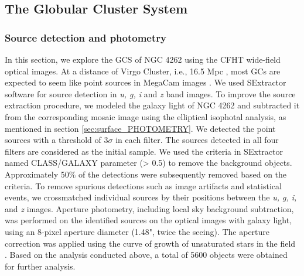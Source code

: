\documentclass[fleqn,usenatbib]{mnras}
\begin{document}
\subsection{The Globular Cluster System}
\label{sec:old_stellar_population_analysis}
\subsubsection{Source detection and photometry}
\label{sec:dectection_photometry}
In this section, we explore the GCS of NGC 4262 using the CFHT wide-field optical images. At a distance of Virgo Cluster, i.e., 16.5 Mpc \citep{2007Mei}, most GCs are expected to seem like point sources in MegaCam images \citep{durell_ngvs2014,2019MNRAS.483.1470R}. We used SExtractor software \citep{Bertin_arnouts1996} for source detection in {\it u, g, i} and {\it z} band images. To improve the source extraction procedure, we modeled the galaxy light of NGC 4262 and subtracted it from the corresponding mosaic image using the elliptical isophotal analysis, as mentioned in section \ref{sec:surface_PHOTOMETRY}. We detected the point sources with a threshold of 3$\sigma$ in each filter. The sources detected in all four filters are considered as the initial sample. We used the criteria in SExtractor named CLASS/GALAXY parameter (> 0.5) to remove the background objects. Approximately 50$\%$ of the detections were subsequently removed based on the criteria. To remove spurious detections such as image artifacts and statistical events, we crossmatched individual sources by their positions between the {\it u, g, i,} and {\it z} images. Aperture photometry, including local sky background subtraction, was performed on the identified sources on the optical images with galaxy light, using an 8-pixel aperture diameter (1.48", twice the seeing). The aperture correction was applied using the curve of growth of unsaturated stars in the field \citep{Ferrarese2012,durell_ngvs2014,2015Liu,2019ko}. Based on the analysis conducted above, a total of 5600 objects were obtained for further analysis.
 
\end{document}
